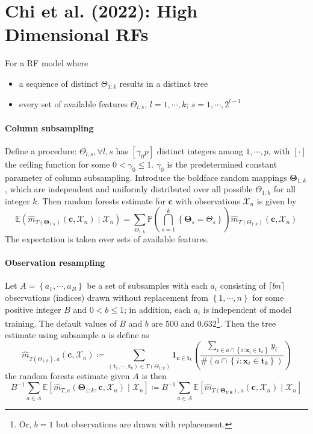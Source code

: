 \documentclass[twoside]{article}
\begin{document}
\section{Chi et al. (2022): High Dimensional RFs}
For a RF model where
\begin{itemize}
    \item a sequence of distinct $\Theta_{1:k}$ results in a distinct tree
    \item every set of available features $\Theta_{l,s}$, $l=1,\cdots,k$; $s=1,\cdots,2^{l-1}$
\end{itemize}

\paragraph*{Column subsampling} Define a  procedure: $\Theta_{l,s},\forall l,s$ has $[\gamma_0p]$ distinct integers among $1,\cdots,p$, with $[\cdot]$ the ceiling function for some $0<\gamma_0\leq 1$. $\gamma_0$ is the predetermined constant parameter of column subsampling.
Introduce the boldface random mappings $\boldsymbol{\Theta}_{1:k}$, which are independent and uniformly distributed over all possible $\Theta_{1:k}$ for all integer $k$. Then random forests estimate for $\mathbf{c}$ with observations $\mathcal{X}_n$ is given by 
\begin{equation*}
    \mathbb{E}\left( \hat{m}_{T(\boldsymbol{\Theta}_{1:k})}\left(\mathbf{c},\mathcal{X}_n\right) \mid \mathcal{X}_n \right) = \sum_{\Theta_{1:k}} \mathbb{P} \left( \bigcap^k_{s=1} \left\{ \boldsymbol{\Theta}_s = \Theta_s \right\} \right) \hat{m}_{T(\Theta_{1:k})} \left(\mathbf{c},\mathcal{X}_n\right)
\end{equation*}
The expectation is taken over sets of available features.

\paragraph*{Observation resampling}
Let $A=\left\{a_1,\cdots, a_B\right\}$ be a set of subsamples with each $a_i$ consisting of $\lceil bn\rceil$ observations (indices) drawn without replacement from $\left\{1,\cdots,n\right\}$ for some positive integer $B$ and $0<b\leq 1$; in addition, each $a_i$ is independent of model training. The default values of $B$ and $b$ are $500$ and $0.632$\footnote{Or, $b=1$ but observations are drawn with replacement.}. Then the tree estimate using subsample $a$ is 
define as 
$$
\hat{m}_{T(\Theta_{1;k}),a}\left(\mathbf{c},\mathcal{X}_n\right) \coloneq \sum_{\left( \mathbf{t}_1,\cdots,\mathbf{t}_k \right)\in T(\Theta_{1:k})}\mathbf{1}_{\mathbf{c}\in\mathbf{t}_k}\left( \frac{\sum_{i\in a\cap \left\{i:\mathbf{x}_i\in\mathbf{t}_k\right\} }y_i}{\#\left(a\cap \left\{i:\mathbf{x}_i\in\mathbf{t}_k\right\}\right) } \right)
$$
the random forests estimate given $A$ is then 
$$
B^{-1}\sum_{a\in A}\mathbb{E}\left[\hat{m}_{T,a}\left(\boldsymbol{\Theta}_{1:k},\mathbf{c},\mathcal{X}_n \right) \mid \mathcal{X}_n\right] \coloneq B^{-1}\sum_{a\in A}\mathbb{E}\left[\hat{m}_{T(\boldsymbol{\Theta_{1:k}}),a}\left(\mathbf{c},\mathcal{X}_n\right)\mid \mathcal{X}_n\right]
$$
\end{document}
